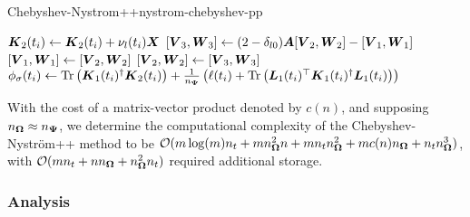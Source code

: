 \documentclass[12pt]{article}
\begin{document}
\begin{algo}{Chebyshev-Nystrom++}{nystrom-chebyshev-pp}
\begin{algorithmic}[1]
        \EndIf
        \State $\boldsymbol{K}_2(t_i) \gets \boldsymbol{K}_2(t_i) + \nu_l(t_i) \boldsymbol{X}$ 
      \EndFor
      \State $[\boldsymbol{V}_3, \boldsymbol{W}_3] \gets (2 - \delta_{l0}) \boldsymbol{A} [\boldsymbol{V}_2, \boldsymbol{W}_2] - [\boldsymbol{V}_1, \boldsymbol{W}_1]$ 
      \State $[\boldsymbol{V}_1, \boldsymbol{W}_1] \gets [\boldsymbol{V}_2, \boldsymbol{W}_2]$
      \State $[\boldsymbol{V}_2, \boldsymbol{W}_2] \gets [\boldsymbol{V}_3, \boldsymbol{W}_3]$
    \EndFor
      \State $\phi_{\sigma}(t_i) \gets \operatorname{Tr}\left( \boldsymbol{K}_1(t_i)^{\dagger}\boldsymbol{K}_2(t_i) \right) + \frac{1}{n_{\boldsymbol{\Psi}}} \left( \ell(t_i) + \operatorname{Tr}\left( \boldsymbol{L}_1(t_i)^{\top} \boldsymbol{K}_1(t_i)^{\dagger} \boldsymbol{L}_1(t_i) \right)  \right) $ \label{lin:4-nystromchebyshev-nystrom-pp}
    \EndFor
\end{algorithmic}
\end{algo}

With the cost of a matrix-vector product denoted by $c(n)$, and supposing $n_{\boldsymbol{\Omega}} \approx n_{\boldsymbol{\Psi}}$, we determine the computational complexity of the Chebyshev-Nyström++ method to be $\mathcal{O}(m \log(m) n_t + m n_{\boldsymbol{\Omega}}^2 n + m n_t n_{\boldsymbol{\Omega}}^2 +  m c(n) n_{\boldsymbol{\Omega}} + n_t n_{\boldsymbol{\Omega}}^3)$, with $\mathcal{O}(m n_t + n n_{\boldsymbol{\Omega}} + n_{\boldsymbol{\Omega}}^2 n_t)$ required additional storage.




\subsubsection{Analysis}
\label{subsubsec:chebyshev-nystrom-analysis}
\end{document}
